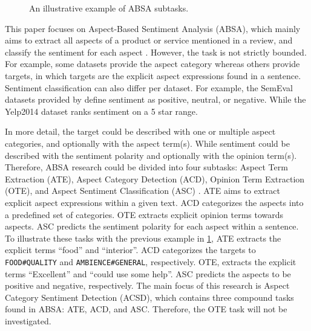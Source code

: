 \documentclass[american, oneside]{ecsgdp}
\begin{document}
\begin{figure}[htbp]
  \centering
  
  \caption{An illustrative example of ABSA subtasks.}
  \label{fig:example_review}
\end{figure}

This paper focuses on Aspect-Based Sentiment Analysis (ABSA), which mainly aims to extract all aspects of a product or service mentioned in a review, and classify the sentiment for each aspect \parencite{Liu2012SAOP}. However, the task is not strictly bounded. For example, some datasets provide the aspect category whereas others provide targets, in which targets are the explicit aspect expressions found in a sentence. Sentiment classification can also differ per dataset. For example, the SemEval datasets provided by \textcite{Pontiki2015SemEval, Pontiki2016SemEval} define sentiment as positive, neutral, or negative. While the Yelp2014 dataset \parencite{Tang2016Yelp} ranks sentiment on a 5 star range.

In more detail, the target could be described with one or multiple aspect categories, and optionally with the aspect term(s). While sentiment could be described with the sentiment polarity and optionally with the opinion term(s). Therefore, ABSA research could be divided into four subtasks: Aspect Term Extraction (ATE), Aspect Category Detection (ACD), Opinion Term Extraction (OTE), and Aspect Sentiment Classification (ASC) \parencite{Zhang2022Survey}. ATE aims to extract explicit aspect expressions within a given text. ACD categorizes the aspects into a predefined set of categories. OTE extracts explicit opinion terms towards aspects. ASC predicts the sentiment polarity for each aspect within a sentence. To illustrate these tasks with the previous example in \cref{fig:example_review}, ATE extracts the explicit terms ``food'' and ``interior''. ACD categorizes the targets to \texttt{FOOD\#QUALITY} and \texttt{AMBIENCE\#GENERAL}, respectively. OTE, extracts the explicit terms ``Excellent'' and ``could use some help''. ASC predicts the aspects to be positive and negative, respectively. The main focus of this research is Aspect Category Sentiment Detection (ACSD), which contains three compound tasks found in ABSA: ATE, ACD, and ASC. Therefore, the OTE task will not be investigated.
\end{document}
